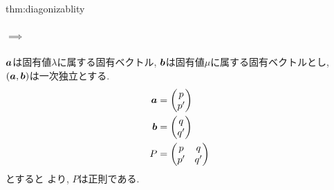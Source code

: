 \begin{proofof}{thm:diagonizablity}
  \paragraph{$\implies$}
  $\boldsymbol{a}$は固有値$\lambda$に属する固有ベクトル,
  $\boldsymbol{b}$は固有値$\mu$に属する固有ベクトルとし,
  $(\boldsymbol{a},\boldsymbol{b})$は一次独立とする.
  \begin{align*}
    \boldsymbol{a}&=
    \begin{pmatrix}
      p\\p'
    \end{pmatrix}\\
    \boldsymbol{b}&=
    \begin{pmatrix}
      q\\q'
    \end{pmatrix}\\
    P&=
    \begin{pmatrix}
      p&q\\p'&q'
    \end{pmatrix}
  \end{align*}
  とすると
  より,
  $P$は正則である.


\end{proofof}
